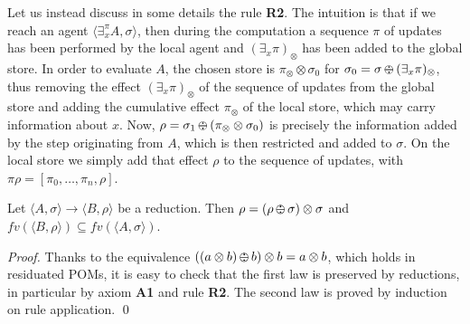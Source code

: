 \documentclass{llncs}
\def\odiv{\, {\ominus\hspace{-7.7pt} \div} \,}
\begin{document}
Let us instead discuss in some details the rule {\bf R2}.
The intuition is that if we reach an agent $\langle \exists^{\pi}_x A,\sigma\rangle$, then during the computation
a sequence $\pi$ of updates has been performed by the local agent and $(\exists_x \pi)_\otimes$ 
has been added to the global store. In order to evaluate $A$, the chosen 
store is 
$\pi_\otimes \otimes \sigma_0$ for $\sigma_0 = \sigma \odiv (\exists_x \pi)_\otimes$, thus removing 
the effect $(\exists_x \pi)_\otimes$ of the sequence of updates from the global store
and adding the cumulative effect $\pi_\otimes$ of the local store, which may carry information about $x$. 
Now, $\rho = \sigma_1 \odiv (\pi_\otimes \otimes \sigma _0)$ 
is precisely the information added by the step originating from $A$, which is then restricted and added to $\sigma$. 
On the local store we simply add that effect $\rho$ to the sequence of updates, with
$\pi \rho = [\pi_0, \ldots, \pi_n, \rho]$.

\begin{lemma}[On monotonicity]
\label{rmono}
Let $\langle A, \sigma \rangle \rightarrow \langle B, \rho \rangle$ be a reduction. 
Then $\rho = (\rho \odiv \sigma) \otimes \sigma$ and $fv(\langle B, \rho \rangle) \subseteq fv(\langle A, \sigma \rangle)$.
\end{lemma}
 

\begin{proof}
Thanks to the equivalence $((a \otimes b) \odiv b) \otimes b = a \otimes b$, which holds in residuated POMs,
it is easy to check that the first law is preserved by reductions,
in particular by axiom \mbox{\bf A1} and rule \mbox{\bf R2}.
The second law is proved by induction on rule application.
\qed
\end{proof}
\end{document}
